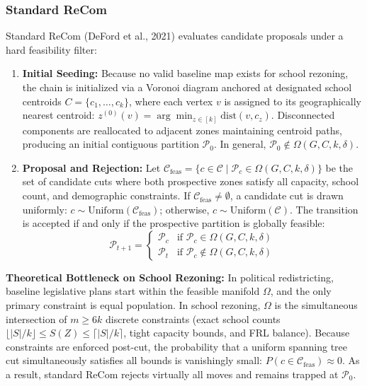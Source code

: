 \documentclass{article}
\begin{document}
\subsubsection{Standard ReCom}
Standard ReCom (DeFord et al., 2021) evaluates candidate proposals under a hard feasibility filter:
\begin{enumerate}
    \item \textbf{Initial Seeding:} Because no valid baseline map exists for school rezoning, the chain is initialized via a Voronoi diagram anchored at designated school centroids $C = \{c_1, \dots, c_k\}$, where each vertex $v$ is assigned to its geographically nearest centroid: $z^{(0)}(v) = \arg\min_{z \in [k]} \text{dist}(v, c_z)$. Disconnected components are reallocated to adjacent zones maintaining centroid paths, producing an initial contiguous partition $\mathcal{P}_0$. In general, $\mathcal{P}_0 \notin \Omega(G, C, k, \delta)$.
    \item \textbf{Proposal and Rejection:} Let $\mathcal{C}_{\text{feas}} = \{c \in \mathcal{C} \mid \mathcal{P}_c \in \Omega(G, C, k, \delta)\}$ be the set of candidate cuts where both prospective zones satisfy all capacity, school count, and demographic constraints. If $\mathcal{C}_{\text{feas}} \neq \emptyset$, a candidate cut is drawn uniformly: $c \sim \text{Uniform}(\mathcal{C}_{\text{feas}})$; otherwise, $c \sim \text{Uniform}(\mathcal{C})$. The transition is accepted if and only if the prospective partition is globally feasible:
    \begin{equation}
    \mathcal{P}_{t+1} = \begin{cases}
    \mathcal{P}_c & \text{if } \mathcal{P}_c \in \Omega(G, C, k, \delta) \\
    \mathcal{P}_t & \text{if } \mathcal{P}_c \notin \Omega(G, C, k, \delta)
    \end{cases}
    \end{equation}
\end{enumerate}
\textbf{Theoretical Bottleneck on School Rezoning:} In political redistricting, baseline legislative plans start within the feasible manifold $\Omega$, and the only primary constraint is equal population. In school rezoning, $\Omega$ is the simultaneous intersection of $m \ge 6k$ discrete constraints (exact school counts $\lfloor |S|/k \rfloor \le S(Z) \le \lceil |S|/k \rceil$, tight capacity bounds, and FRL balance). Because constraints are enforced post-cut, the probability that a uniform spanning tree cut simultaneously satisfies all bounds is vanishingly small: $P(c \in \mathcal{C}_{\text{feas}}) \approx 0$. As a result, standard ReCom rejects virtually all moves and remains trapped at $\mathcal{P}_0$.
\end{document}
